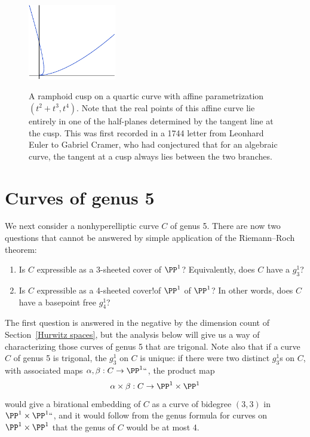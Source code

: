 \begin{figure}
\includegraphics[height=1.3in]{"main/ramphoid"}
\caption{A ramphoid cusp on a quartic curve with affine parametrization
$(t^2{+}t^3,t^4)$. Note that the real points of this affine curve lie
entirely in one of the half-planes determined by the tangent line
at the cusp. This was first recorded in a 1744 letter from Leonhard Euler to
Gabriel Cramer,
who had conjectured that for an algebraic curve, the
tangent at a cusp always lies between the two branches.}
%
%
\label{ramphoid}
\end{figure}
%

\section{Curves of genus 5}

We next consider a nonhyperelliptic curve $C$ of genus 5. There are
%
now two questions that cannot be answered by simple application of the
Riemann--Roch
theorem:

\begin{enumerate}
\item Is $C$ expressible as a
3-sheeted cover
%
of $\PP^1$?
Equivalently,
does $C$ have a
$g^1_3$?%
%
\item Is $C$ expressible as a
4-sheeted cover!of $\PP\sp 1$
of $\PP^1$?
In other words, does $C$ have a basepoint free
$g^1_4$?
%
\end{enumerate}

The first question is answered in the negative by the dimension count
of Section~\ref{Hurwitz spaces}, but the analysis below will give us a
way of characterizing those curves of genus 5 that are trigonal. Note
also that if a curve $C$ of genus 5 is trigonal, the $g^1_3$ on $C$ is
unique: if there were two distinct $g^1_3$s on $C$, with associated
maps $\alpha, \beta : C \to \PP^1` `$, the product map
$$
\alpha \times \beta : C \to \PP^1 \times \PP^1
$$
would give a
birational
%
embedding of $C$ as a curve of
bidegree $(3,3)$
in $\PP^1 \times \PP^1` `$, and it would follow from the genus formula
for curves on $\PP^1 \times \PP^1$ that the genus of $C$ would be at most 4.
%


